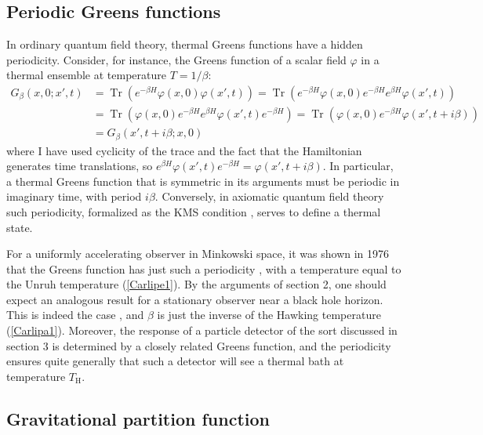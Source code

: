 \documentclass[12pt]{article}
\begin{document}
\subsection{Periodic Greens functions \label{Greena}}

In ordinary quantum field theory,
thermal Greens functions have a hidden periodicity.  Consider, for
instance, the Greens function of a scalar field $\varphi$ in a thermal
ensemble at temperature $T = 1/\beta$:
\begin{align}
G_\beta(x,0;x',t) 
    &= \mathop{Tr}\left(e^{-\beta H}\varphi(x,0)\varphi(x',t)\right) 
    = \mathop{Tr}\left(e^{-\beta H}\varphi(x,0)e^{-\beta H}e^{\beta H}%
      \varphi(x',t)\right)\nonumber\\
   &=\mathop{Tr}\left(\varphi(x,0)e^{-\beta H}e^{\beta H}\varphi(x',t)%
  e^{-\beta H}\right) 
 =\mathop{Tr}\left(\varphi(x,0)e^{-\beta H}\varphi(x',t+i\beta)\right)\nonumber\\
 &= G_\beta(x',t+i\beta;x,0) \label{Carlipe6}
\end{align}
where I have used cyclicity of the trace and the fact that the 
Hamiltonian generates time translations, so 
$e^{\beta H}\varphi(x',t)e^{-\beta H} = \varphi(x',t+i\beta)$.  
In particular, a thermal Greens function that is symmetric in its arguments 
must be periodic in imaginary time, with period $i\beta$.  Conversely,
in axiomatic quantum field theory such periodicity, formalized
as the KMS condition \cite{Kubo,Martin,Haag}, serves to define
a thermal state.

For a uniformly accelerating observer in Minkowski space, it was
shown in 1976 that the Greens function has just such a periodicity
\cite{Bisognano}, with a temperature equal to the Unruh temperature
(\ref{Carlipe1}).  By the arguments of section 2, one
should expect an analogous result for a stationary observer
near a black hole horizon.  This is indeed the case \cite{Gibb,Gibc},
and  $\beta$ is just the inverse of the
Hawking temperature (\ref{Carlipa1}).  Moreover, the response of
a particle detector of the sort discussed in section 3
is determined by a closely related Greens function, and the
periodicity ensures quite generally that such a detector will see
a thermal bath at temperature $T_{\scriptscriptstyle\mathrm{H}}$.

\subsection{Gravitational partition function \label{parta}}
\end{document}

